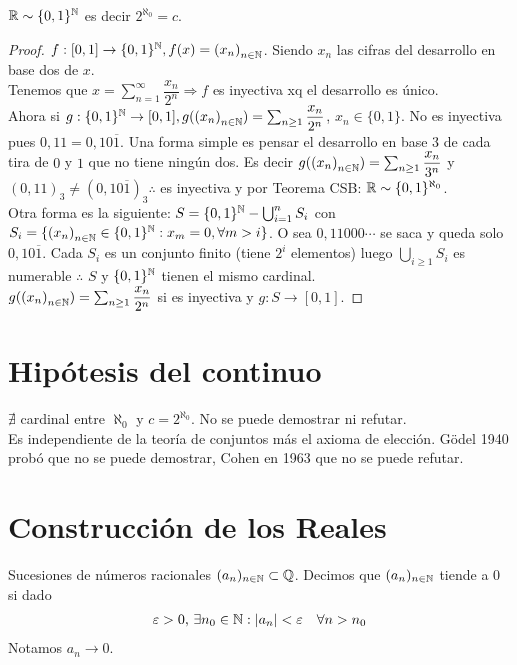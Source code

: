 \begin{theorem}
  \(\mathbb{R} \sim \{ 0, 1 \}^{\mathbb{N}} \) es decir \(2^{\aleph_0} = c\).
  \begin{proof}
    \(f: [0, 1] \to \{ 0, 1 \}^{\mathbb{N}}, f(x) = {(x_n)}_{n \in \mathbb{N}} \). Siendo \(x_n\) las cifras del desarrollo en base dos de \(x\). \\
    Tenemos que \(x = \sum_{n=1}^\infty \dfrac{x_n}{2^n} \Rightarrow f\) es inyectiva xq el desarrollo es único. \\
    Ahora si \(g: \{ 0, 1 \}^{\mathbb{N}} \to [0, 1], g({(x_n)}_{n \in \mathbb{N}}) = \sum_{n \geq 1} \dfrac{x_n}{2^n} \), \(x_n \in \{0, 1\} \). No es inyectiva pues \(0,11 = 0,10\overline{1} \).
    Una forma simple es pensar el desarrollo en base \(3\) de cada tira de \(0\) y \(1\) que no tiene ningún dos. Es decir \(g({(x_n)}_{n \in \mathbb{N}}) = \sum_{n \geq 1} \dfrac{x_n}{3^n} \) y \((0,11)_3 \neq (0,10\overline{1})_3 \therefore \)
    es inyectiva y por Teorema CSB: \(\mathbb{R} \sim \{0,1\}^{\aleph_0} \). \\
    Otra forma es la siguiente:
    \(S = \{0, 1\}^{\mathbb{N}} - \bigcup_{i=1}^n S_i\) con \(S_i = \{ {(x_n)}_{n \in \mathbb{N}} \in \{0, 1\}^{\mathbb{N}} : x_m = 0, \forall m > i \} \). O sea \(0,11000\cdots \) se saca y queda solo \(0,10\overline{1} \).
    Cada \(S_i\) es un conjunto finito (tiene \(2^i\) elementos) luego \(\bigcup_{i \geq 1} S_i\) es numerable \(\therefore \) \(S\) y \(\{0,1\}^{\mathbb{N}} \) tienen el mismo cardinal. \\
    \(g({(x_n)}_{n \in \mathbb{N}}) = \sum_{n \geq 1} \dfrac{x_n}{2^n} \) si es inyectiva y \(g: S \to [0, 1]\).
  \end{proof}
\end{theorem}

\section{Hipótesis del continuo}

\(\nexists\) cardinal entre \(\aleph_0\) y \(c = 2^{\aleph_0} \). No se puede demostrar ni refutar. \\
Es independiente de la teoría de conjuntos más el axioma de elección.
Gödel 1940 probó que no se puede demostrar, Cohen en 1963 que no se puede refutar.

\section{Construcción de los Reales}

Sucesiones de números racionales \((a_n)_{n \in \mathbb{N}} \subset \mathbb{Q} \). Decimos que \((a_n)_{n \in \mathbb{N}} \) tiende a 0 si dado \begin{align*}
  \varepsilon > 0\text{, } \exists n_0 \in \mathbb{N} : |a_n| < \varepsilon \quad \forall n > n_0
\end{align*} Notamos \(a_n \to 0\).

